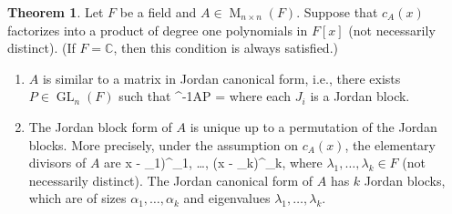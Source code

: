\documentclass[12pt]{article}
\def\[#1\]{\begin{align*}#1\end{align*}}
\theoremstyle{definition}
\newtheorem{theorem}{Theorem}
\newcommand{\C}{\mathbb{C}}
\newcommand{\<}{\left\langle}
\renewcommand{\>}{\right\rangle}
\newcommand{\sqMat}[1]{\operatorname{M}_{#1 \times #1}}
\newcommand{\MnF}{\sqMat{n}(F)}
\newcommand{\GLn}{\operatorname{GL}_{n}}
\begin{document}
\begin{theorem}
    Let $F$ be a field and $A \in \MnF$. Suppose that $c_A(x)$ factorizes into a product of degree one polynomials in $F[x]$ (not necessarily distinct). (If $F = \C$, then this condition is always satisfied.)
    \begin{enumerate}[(1)]
        \item $A$ is similar to a matrix in Jordan canonical form, i.e., there exists $P \in \GLn(F)$ such that
        \[
            P^{-1}AP = 
        \]
        where each $J_i$ is a Jordan block.
        
        \item The Jordan block form of $A$ is unique up to a permutation of the Jordan blocks. More precisely, under the assumption on $c_A(x)$, the elementary divisors of $A$ are
        \[
            (x - \lambda_1)^{\alpha_1}, \dots, (x - \lambda_k)^{\alpha_k},
        \]
        where $\lambda_1, \dots, \lambda_k \in F$ (not necessarily distinct). The Jordan canonical form of $A$ has $k$ Jordan blocks, which are of sizes $\alpha_1, \dots, \alpha_k$ and eigenvalues $\lambda_1, \dots, \lambda_k$.
    \end{enumerate}
\end{theorem}
\end{document}
